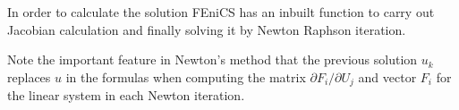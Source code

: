 \smallskip

\noindent In order to calculate the solution FEniCS has an inbuilt function to carry out Jacobian calculation and finally solving it by Newton Raphson iteration.

\smallskip

\noindent Note the important feature in Newton’s method that the previous solution $u_k$ replaces $u$ in the formulas when computing the matrix $\partial F_i/\partial U_j$ and vector $F_i$ for the linear system in each Newton iteration.

\pagebreak
